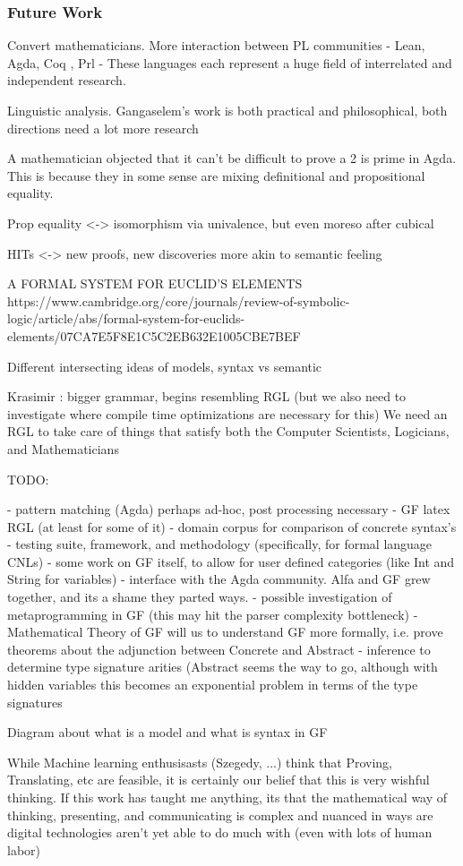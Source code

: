 \documentclass[10pt]{beamer}
\begin{document}
\begin{frame}
\frametitle{Future Work}

Convert mathematicians.
More interaction between PL communities - Lean, Agda, Coq , {Prl} -
These languages each represent a  huge field of interrelated and independent research.

Linguistic analysis.  Gangaselem's work is both practical and philosophical,
both directions need a lot more research

A mathematician objected that it can't be difficult to prove a 2 is prime in
Agda. This is because they in some sense are mixing definitional and
propositional equality.

Prop equality <-> isomorphism via univalence, but even moreso after cubical

HITs <-> new proofs, new discoveries more akin to semantic feeling

A FORMAL SYSTEM FOR EUCLID’S ELEMENTS
https://www.cambridge.org/core/journals/review-of-symbolic-logic/article/abs/formal-system-for-euclids-elements/07CA7E5F8E1C5C2EB632E1005CBE7BEF

Different intersecting ideas of models, syntax vs semantic

Krasimir : bigger grammar, begins resembling RGL
(but we also need to
investigate where compile time optimizations are necessary for this)
We need an RGL to take care of things that satisfy both the Computer Scientists,
Logicians, and Mathematicians

TODO:


- pattern matching (Agda) perhaps ad-hoc, post processing necessary
- GF latex RGL (at least for some of it)
- domain corpus for comparison of concrete syntax's
- testing suite, framework, and methodology (specifically, for formal language CNLs)
- some work on GF itself, to allow for user defined categories (like Int and
String for variables)
- interface with the Agda community.  Alfa and GF grew together, and its a shame
they parted ways.
- possible investigation of metaprogramming in GF (this may hit the parser
complexity bottleneck)
- Mathematical Theory of GF will us to understand GF more formally, i.e. prove
theorems about the adjunction between Concrete and Abstract
- inference to determine type signature arities (Abstract seems the way to go,
although with hidden variables this becomes an exponential problem in terms of
the type signatures

Diagram about what is a model and what is syntax in GF

While Machine learning enthusisasts (Szegedy, ...) think that Proving,
Translating, etc are feasible, it is certainly our belief that this is very
wishful thinking.  If this work has taught me anything, its that the
mathematical way of thinking, presenting, and communicating is complex and nuanced in ways
are digital technologies aren't yet able to do much with (even with lots of
human labor)

\end{frame}
\end{document}
